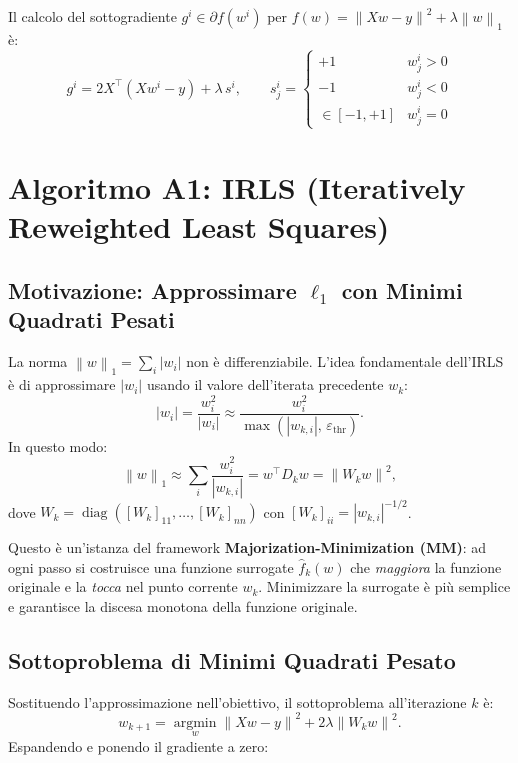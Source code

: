 \documentclass[11pt,a4paper]{article}
\theoremstyle{definition}
\theoremstyle{plain}
\theoremstyle{remark}
\newcommand{\norm}[1]{\left\| #1 \right\|}
\newcommand{\T}{^{\top}}
\newcommand{\subgr}{\partial}
\newcommand{\argmin}{\operatorname*{argmin}}
\begin{document}
Il calcolo del sottogradiente $g^i \in \subgr f(w^i)$ per $f(w) = \norm{Xw-y}^2 + \lambda\norm{w}_1$ è:
\[
  g^i = 2X\T(Xw^i - y) + \lambda\, s^i,
  \qquad s^i_j = \begin{cases} +1 & w^i_j > 0 \\ -1 & w^i_j < 0 \\ \in [-1,+1] & w^i_j = 0 \end{cases}
\]

\section{Algoritmo A1: IRLS (Iteratively Reweighted Least Squares)}
\label{sec:a1}

\subsection{Motivazione: Approssimare $\ell_1$ con Minimi Quadrati Pesati}

La norma $\norm{w}_1 = \sum_i |w_i|$ non è differenziabile. L'idea fondamentale dell'IRLS
è di approssimare $|w_i|$ usando il valore dell'iterata precedente $w_k$:
\[
  |w_i| = \frac{w_i^2}{|w_i|} \approx \frac{w_i^2}{\max(|w_{k,i}|,\,\varepsilon_{\text{thr}})}.
\]
In questo modo:
\[
  \norm{w}_1 \approx \sum_i \frac{w_i^2}{|w_{k,i}|} = w\T D_k w = \norm{W_k w}^2,
\]
dove $W_k = \operatorname{diag}([W_k]_{11}, \ldots, [W_k]_{nn})$ con $[W_k]_{ii} = |w_{k,i}|^{-1/2}$.

\begin{intubox}
  Questo è un'istanza del framework \textbf{Majorization-Minimization (MM)}:
  ad ogni passo si costruisce una funzione surrogate $\hat{f}_k(w)$ che
  \emph{maggiora} la funzione originale e la \emph{tocca} nel punto corrente $w_k$.
  Minimizzare la surrogate è più semplice e garantisce la discesa monotona della funzione originale.
\end{intubox}

\subsection{Sottoproblema di Minimi Quadrati Pesato}

Sostituendo l'approssimazione nell'obiettivo, il sottoproblema all'iterazione $k$ è:
\[
  w_{k+1} = \argmin_w \norm{Xw - y}^2 + 2\lambda\norm{W_k w}^2.
\]
Espandendo e ponendo il gradiente a zero:
\end{document}
